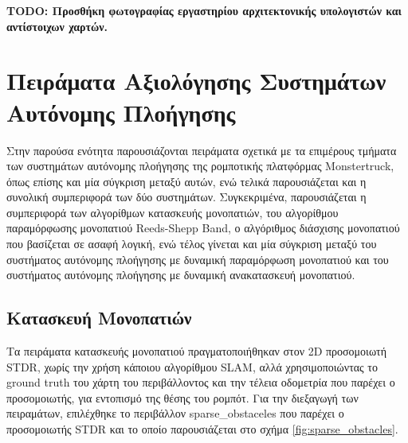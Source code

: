 \textbf{TODO: Προσθήκη φωτογραφίας εργαστηρίου αρχιτεκτονικής υπολογιστών και αντίστοιχων χαρτών.}


\FloatBarrier
\newpage
\section{Πειράματα Αξιολόγησης Συστημάτων Αυτόνομης Πλοήγησης} \label{sec:navigation_experiments}
Στην παρούσα ενότητα παρουσιάζονται πειράματα σχετικά με τα επιμέρους τμήματα των συστημάτων αυτόνομης πλοήγησης της ρομποτικής πλατφόρμας Monstertruck, όπως επίσης και μία σύγκριση μεταξύ αυτών, ενώ τελικά παρουσιάζεται και η συνολική συμπεριφορά των δύο συστημάτων. Συγκεκριμένα, παρουσιάζεται η συμπεριφορά των αλγορίθμων κατασκευής μονοπατιών, του αλγορίθμου παραμόρφωσης μονοπατιού Reeds-Shepp Band, ο αλγόριθμος διάσχισης μονοπατιού που βασίζεται σε ασαφή λογική, ενώ τέλος γίνεται και μία σύγκριση μεταξύ του συστήματος αυτόνομης πλοήγησης με δυναμική παραμόρφωση μονοπατιού και του συστήματος αυτόνομης πλοήγησης με δυναμική ανακατασκευή μονοπατιού.

\subsection{Κατασκευή Μονοπατιών} \label{ssec:path_planning_experiments}
Τα πειράματα κατασκευής μονοπατιού πραγματοποιήθηκαν στον 2D προσομοιωτή STDR, χωρίς την χρήση κάποιου αλγορίθμου SLAM, αλλά χρησιμοποιώντας το ground truth του χάρτη του περιβάλλοντος και την τέλεια οδομετρία που παρέχει ο προσομοιωτής, για εντοπισμό της θέσης του ρομπότ. Για την διεξαγωγή των πειραμάτων, επιλέχθηκε το περιβάλλον sparse{\_}obstaceles που παρέχει ο προσομοιωτής STDR και το οποίο παρουσιάζεται στο σχήμα \ref{fig:sparse_obstacles}.

